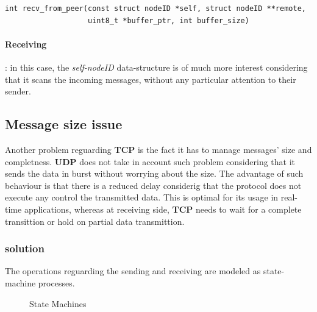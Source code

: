 \begin{lstlisting}
int recv_from_peer(const struct nodeID *self, struct nodeID **remote,
                   uint8_t *buffer_ptr, int buffer_size)
\end{lstlisting}
\paragraph{Receiving}: in this case, the \textit{self-nodeID} data-structure is of much more interest
considering that it scans the incoming messages, without any particular attention to their sender.


\subsection{Message size issue}
Another problem reguarding \textbf{TCP} is the fact it has to manage messages' size and completness.
\textbf{UDP} does not take in account such problem considering that it sends the data in burst without
worrying about the size. The advantage of such behaviour is that there is a reduced delay considerig that
the protocol does not execute any control the transmitted data. This is optimal for its usage in real-time
applications, whereas at receiving side, \textbf{TCP} needs to wait for a complete transittion or hold on
partial data transmittion.

\subsubsection{solution}
The operations reguarding the sending and receiving are modeled as state-machine processes.

\begin{figure}[ht!]
  \begin{center}
  \end{center}
  \caption{%
    State Machines
  }%
\end{figure}
